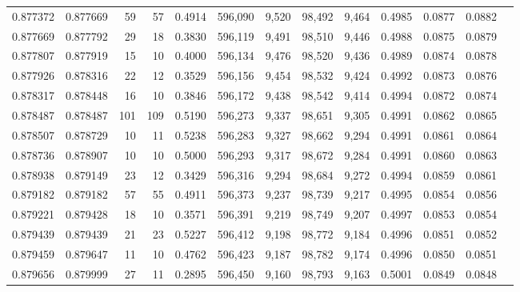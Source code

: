 \begin{tabular}{rrrrrrrrrrrrr}
0.877372 & 0.877669 &    59 &  57 &                                     0.4914 & 596,090 &   9,520 &  98,492 &   9,464 & 0.4985 & 0.0877 & 0.0882 \\
0.877669 & 0.877792 &    29 &  18 &                                     0.3830 & 596,119 &   9,491 &  98,510 &   9,446 & 0.4988 & 0.0875 & 0.0879 \\
0.877807 & 0.877919 &    15 &  10 &                                     0.4000 & 596,134 &   9,476 &  98,520 &   9,436 & 0.4989 & 0.0874 & 0.0878 \\
0.877926 & 0.878316 &    22 &  12 &                                     0.3529 & 596,156 &   9,454 &  98,532 &   9,424 & 0.4992 & 0.0873 & 0.0876 \\
0.878317 & 0.878448 &    16 &  10 &                                     0.3846 & 596,172 &   9,438 &  98,542 &   9,414 & 0.4994 & 0.0872 & 0.0874 \\
0.878487 & 0.878487 &   101 & 109 &                                     0.5190 & 596,273 &   9,337 &  98,651 &   9,305 & 0.4991 & 0.0862 & 0.0865 \\
0.878507 & 0.878729 &    10 &  11 &                                     0.5238 & 596,283 &   9,327 &  98,662 &   9,294 & 0.4991 & 0.0861 & 0.0864 \\
0.878736 & 0.878907 &    10 &  10 &                                     0.5000 & 596,293 &   9,317 &  98,672 &   9,284 & 0.4991 & 0.0860 & 0.0863 \\
0.878938 & 0.879149 &    23 &  12 &                                     0.3429 & 596,316 &   9,294 &  98,684 &   9,272 & 0.4994 & 0.0859 & 0.0861 \\
0.879182 & 0.879182 &    57 &  55 &                                     0.4911 & 596,373 &   9,237 &  98,739 &   9,217 & 0.4995 & 0.0854 & 0.0856 \\
0.879221 & 0.879428 &    18 &  10 &                                     0.3571 & 596,391 &   9,219 &  98,749 &   9,207 & 0.4997 & 0.0853 & 0.0854 \\
0.879439 & 0.879439 &    21 &  23 &                                     0.5227 & 596,412 &   9,198 &  98,772 &   9,184 & 0.4996 & 0.0851 & 0.0852 \\
0.879459 & 0.879647 &    11 &  10 &                                     0.4762 & 596,423 &   9,187 &  98,782 &   9,174 & 0.4996 & 0.0850 & 0.0851 \\
0.879656 & 0.879999 &    27 &  11 &                                     0.2895 & 596,450 &   9,160 &  98,793 &   9,163 & 0.5001 & 0.0849 & 0.0848 \\

\end{tabular}
